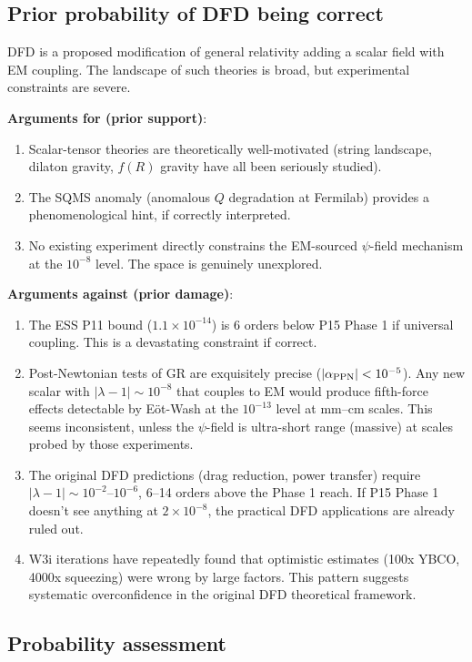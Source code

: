 \documentclass[11pt]{article}
\newcommand{\ee}[1]{\times 10^{#1}}
\newcommand{\lam}{\lambda}
\begin{document}
\subsection{Prior probability of DFD being correct}

DFD is a proposed modification of general relativity adding a scalar field
with EM coupling. The landscape of such theories is broad, but experimental
constraints are severe.

\textbf{Arguments for (prior support)}:
\begin{enumerate}
\item Scalar-tensor theories are theoretically well-motivated (string landscape,
dilaton gravity, $f(R)$ gravity have all been seriously studied).
\item The SQMS anomaly (anomalous $Q$ degradation at Fermilab) provides a
phenomenological hint, if correctly interpreted.
\item No existing experiment directly constrains the EM-sourced $\psi$-field
mechanism at the $10^{-8}$ level. The space is genuinely unexplored.
\end{enumerate}

\textbf{Arguments against (prior damage)}:
\begin{enumerate}
\item The ESS P11 bound ($1.1\ee{-14}$) is 6 orders below P15 Phase 1
if universal coupling. This is a devastating constraint if correct.
\item Post-Newtonian tests of GR are exquisitely precise ($|\alpha_{\rm PPN}|
< 10^{-5}$). Any new scalar with $|\lam-1| \sim 10^{-8}$ that couples to
EM would produce fifth-force effects detectable by E\"ot-Wash at the $10^{-13}$
level at mm--cm scales. This seems inconsistent, unless the $\psi$-field is
ultra-short range (massive) at scales probed by those experiments.
\item The original DFD predictions (drag reduction, power transfer) require
$|\lam-1| \sim 10^{-2}$--$10^{-6}$, 6--14 orders above the Phase 1 reach.
If P15 Phase 1 doesn't see anything at $2\ee{-8}$, the practical DFD
applications are already ruled out.
\item W3i iterations have repeatedly found that optimistic estimates
(100x YBCO, 4000x squeezing) were wrong by large factors. This pattern
suggests systematic overconfidence in the original DFD theoretical framework.
\end{enumerate}

\subsection{Probability assessment}
\end{document}
